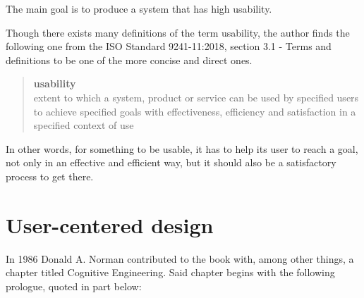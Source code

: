 The main goal is to produce a system that has high usability. 

Though there exists many definitions of the term usability, the author finds the
following one from the ISO Standard 9241-11:2018\cite{citeISO9241}, section 3.1
- Terms and definitions to be one of the more concise and direct ones.
\begin{quote}
  \textbf{usability} \\
  extent to which a system, product or service can be used by specified users to
  achieve specified goals with effectiveness, efficiency and satisfaction in a
  specified context of use
\end{quote}

In other words, for something to be usable, it has to help its user to
reach a goal, not only in an effective and efficient way, but it should also be
a satisfactory process to get there.

%
%


\section{User-centered design}

In 1986 Donald A. Norman contributed to the book
\cite{citeUserCenteredNorman} with, among
other things, a chapter titled Cognitive Engineering\cite[p.
31]{citeUserCenteredNorman}. Said chapter begins with the following prologue,
quoted in part below:

